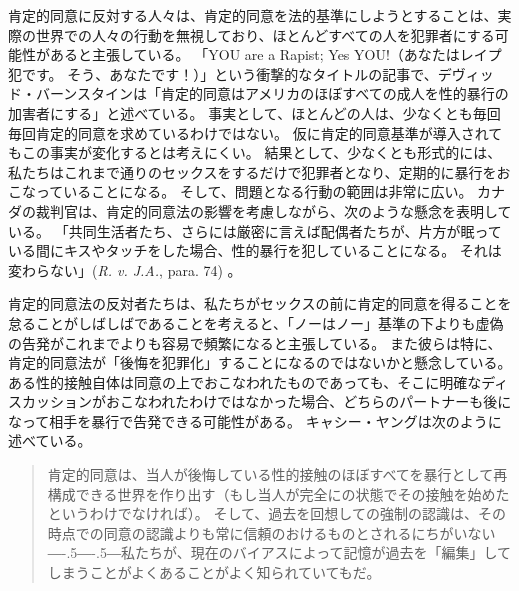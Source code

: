 \documentclass[paper=a4,book,openany]{jlreq}
\newcommand{\ig}[1]{}           %
\def\DDASH{―\kern-.5\zw―\kern-.5\zw―} %
\begin{document}
肯定的同意に反対する人々は、肯定的同意を法的基準にしようとすることは、実際の世界での人々の行動を無視しており、ほとんどすべての人を犯罪者にする可能性があると主張している。
「YOU are a Rapist; Yes YOU!（あなたはレイプ犯です。
そう、あなたです！）」という衝撃的なタイトルの記事で、デヴィッド・バーンスタイン\ig{David Bernstein}は「肯定的同意はアメリカのほぼすべての成人を性的暴行の加害者にする」と述べている\citep{bernstein14:_you_are_rapis}。
\ig{David Bernstein}
事実として、ほとんどの人は、少なくとも毎回毎回肯定的同意を求めているわけではない。
仮に肯定的同意基準が導入されてもこの事実が変化するとは考えにくい。
結果として、少なくとも形式的には、私たちはこれまで通りのセックスをするだけで犯罪者となり、定期的に暴行をおこなっていることになる。
そして、問題となる行動の範囲は非常に広い。
カナダの裁判官は、肯定的同意法の影響を考慮しながら、次のような懸念を表明している。
「共同生活者たち、さらには厳密に言えば配偶者たちが、片方が眠っている間にキスやタッチをした場合、性的暴行を犯していることになる。
それは変わらない」(\emph{R. v. J.A.}, \ig{2011 SCC 28,} para. 74\ig{\footnote{\url{https://scc-csc.lexum.com/scc-csc/scc-csc/en/item/7942/index.do}.}}) 。

肯定的同意法の反対者たちは、私たちがセックスの前に肯定的同意を得ることを怠ることがしばしばであることを考えると、「ノーはノー」基準の下よりも虚偽の告発がこれまでよりも容易で頻繁になると主張している。
また彼らは特に、肯定的同意法が「後悔を犯罪化」することになるのではないかと懸念している。
ある性的接触自体は同意の上でおこなわれたものであっても、そこに明確なディスカッションがおこなわれたわけではなかった場合、どちらのパートナーも後になって相手を暴行で告発できる可能性がある。
キャシー・ヤングは次のように述べている。

\begin{quote}
肯定的同意は、当人が後悔している性的接触のほぼすべてを暴行として再構成できる世界を作り出す（もし当人が完全にの状態でその接触を始めたというわけでなければ）。
そして、過去を回想しての強制の認識は、その時点での同意の認識よりも常に信頼のおけるものとされるにちがいない{\DDASH}私たちが、現在のバイアスによって記憶が過去を「編集」してしまうことがよくあることがよく知られていてもだ。
\citep{young15:_femin_want_us_defin_these}
\end{quote}
\end{document}
